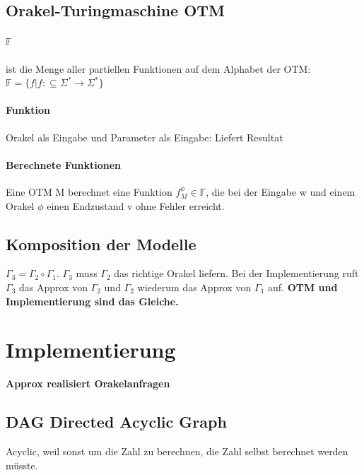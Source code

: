 \documentclass[ngerman]{scrartcl}
\begin{document}
\subsection{Orakel-Turingmaschine OTM}
\paragraph{$ \mathbb{F} $}
ist die Menge aller partiellen Funktionen auf dem Alphabet der OTM: \\
 $ \mathbb{F} = \{ f | f: \subseteq \Sigma^* \rightarrow  \Sigma^* \}$
\paragraph{Funktion} Orakel als Eingabe und Parameter als Eingabe: Liefert Resultat

\paragraph{Berechnete Funktionen}
Eine OTM M berechnet eine Funktion $ f_M^\phi \in \mathbb{F}$, die bei der Eingabe w und einem Orakel $ \phi $ einen Endzustand v ohne Fehler erreicht.

\subsection{Komposition der Modelle}
$ \Gamma_3 = \Gamma_2 \circ \Gamma_1 $. $ \Gamma_3 $ muss $ \Gamma_2 $ das richtige Orakel liefern. Bei der Implementierung ruft $ \Gamma_3 $ das Approx von $ \Gamma_2 $ und $ \Gamma_2 $ wiederum das Approx von $ \Gamma_1 $ auf. \textbf{OTM und Implementierung sind das Gleiche.}

%
%

\section{Implementierung}
\textbf{Approx realisiert Orakelanfragen}

\subsection{DAG Directed Acyclic Graph}
Acyclic, weil sonst um die Zahl zu berechnen, die Zahl selbst berechnet werden müsste.
\end{document}
